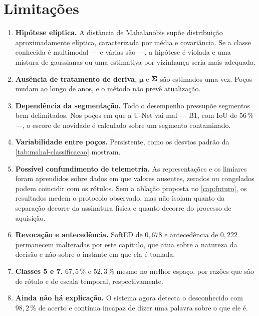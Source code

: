 \section{Limitações}

\begin{enumerate}[leftmargin=*,itemsep=0.4em]

\item \textbf{Hipótese elíptica.} A distância de Mahalanobis supõe distribuição
aproximadamente elíptica, caracterizada por média e covariância. Se a classe conhecida é
multimodal --- e várias são ---, a hipótese é violada e uma mistura de gaussianas ou uma
estimativa por vizinhança seria mais adequada.

\item \textbf{Ausência de tratamento de deriva.} $\bm{\mu}$ e $\bm{\Sigma}$ são
estimados uma vez. Poços mudam ao longo de anos, e o método não prevê atualização.

\item \textbf{Dependência da segmentação.} Todo o desempenho pressupõe segmentos bem
delimitados. Nos poços em que a U-Net vai mal --- B1, com IoU de $56\,\%$ ---, o escore
de novidade é calculado sobre um segmento contaminado.

\item \textbf{Variabilidade entre poços.} Persistente, como os desvios padrão da
\cref{tab:mahal-classificacao} mostram.

\item \textbf{Possível confundimento de telemetria.} As representações e os limiares
foram aprendidos sobre dados em que valores ausentes, zerados ou congelados podem
coincidir com os rótulos. Sem a ablação proposta no \cref{cap:futuro}, os resultados
medem o protocolo observado, mas não isolam quanto da separação decorre da assinatura
física e quanto decorre do processo de aquisição.

\item \textbf{Revocação e antecedência.} SoftED de $0{,}678$ e antecedência de $0{,}222$
permanecem inalteradas por este capítulo, que atua sobre a natureza da decisão e não
sobre o instante em que ela é tomada.

\item \textbf{Classes 5 e 7.} $67{,}5\,\%$ e $52{,}3\,\%$ mesmo no melhor espaço, por
razões que são de rótulo e de escala temporal, respectivamente.

\item \textbf{Ainda não há explicação.} O sistema agora detecta o desconhecido com
$98{,}2\,\%$ de acerto e continua incapaz de dizer uma palavra sobre o que ele é.

\end{enumerate}


